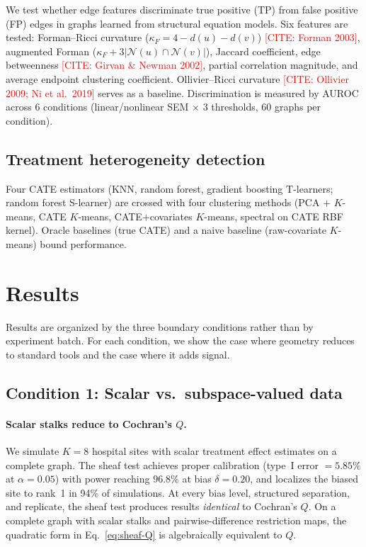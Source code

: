 \documentclass[11pt]{article}
\newcommand{\misscite}[1]{\textcolor{red}{[CITE: #1]}}
\begin{document}
We test whether edge features discriminate true positive (TP) from false positive (FP) edges in graphs learned from structural equation models.
Six features are tested: Forman--Ricci curvature ($\kappa_F = 4 - d(u) - d(v)$) \misscite{Forman 2003}, augmented Forman ($\kappa_F + 3|\mathcal{N}(u) \cap \mathcal{N}(v)|$), Jaccard coefficient, edge betweenness \misscite{Girvan \& Newman 2002}, partial correlation magnitude, and average endpoint clustering coefficient.
Ollivier--Ricci curvature \misscite{Ollivier 2009; Ni et al.\ 2019} serves as a baseline.
Discrimination is measured by AUROC across 6 conditions (linear/nonlinear SEM $\times$ 3 thresholds, 60 graphs per condition).

\subsection{Treatment heterogeneity detection}
\label{sec:meth-hte}

Four CATE estimators (KNN, random forest, gradient boosting T-learners; random forest S-learner) are crossed with four clustering methods (PCA $+$ $K$-means, CATE $K$-means, CATE$+$covariates $K$-means, spectral on CATE RBF kernel).
Oracle baselines (true CATE) and a naive baseline (raw-covariate $K$-means) bound performance.

\section{Results}
\label{sec:results}

Results are organized by the three boundary conditions rather than by experiment batch.
For each condition, we show the case where geometry reduces to standard tools and the case where it adds signal.

\subsection{Condition 1: Scalar vs.\ subspace-valued data}
\label{sec:res-scalar-vs-subspace}

\paragraph{Scalar stalks reduce to Cochran's $Q$.}
We simulate $K = 8$ hospital sites with scalar treatment effect estimates on a complete graph.
The sheaf test achieves proper calibration (type~I error $= 5.85\%$ at $\alpha = 0.05$) with power reaching $96.8\%$ at bias $\delta = 0.20$, and localizes the biased site to rank~1 in 94\% of simulations.
At every bias level, structured separation, and replicate, the sheaf test produces results \emph{identical} to Cochran's $Q$.
On a complete graph with scalar stalks and pairwise-difference restriction maps, the quadratic form in Eq.~\eqref{eq:sheaf-Q} is algebraically equivalent to $Q$.
\end{document}
